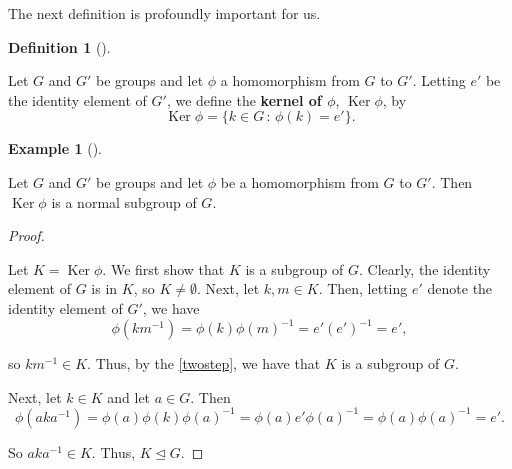 \documentclass[10pt,]{book}
\newcommand{\terminology}[1]{\textbf{#1}}
\theoremstyle{plain}
\theoremstyle{definition}
\newtheorem{definition}[theorem]{Definition}
\theoremstyle{definition}
\theoremstyle{definition}
\newtheorem{example}[theorem]{Example}
\theoremstyle{definition}
\numberwithin{equation}{section}
\DeclareMathOperator{\Ker}{Ker}
\begin{document}
    The next definition is profoundly important for us.
\begin{definition}[{}]\label{definition-66}

        Let \(G\) and \(G'\) be groups and let \(\phi\) a
        homomorphism from \(G\) to \(G'\). Letting \(e'\) be the identity
        element of \(G'\), we define the \terminology{kernel of \(\phi\)}, \(\Ker
        \phi\), by
\begin{equation*}

          \Ker \phi = \{k\in G\,:\,\phi(k)=e'\}.
        
\end{equation*}

\label{notation-73}
\end{definition}
\begin{example}[]\label{example-81}

        Let \(G\) and \(G'\) be groups and let \(\phi\) be a
        homomorphism from \(G\) to \(G'\). Then \(\Ker \phi\) is a normal subgroup
        of \(G\).
\begin{proof}\hypertarget{proof-45}{}

        Let \(K=\Ker \phi\). We first show that \(K\) is a subgroup of
        \(G\). Clearly, the identity element of \(G\) is in \(K\), so \(K\neq
        \emptyset\). Next, let \(k,m\in K\). Then, letting \(e'\) denote the
        identity element of \(G'\), we have
\begin{equation*}

          \phi(km^{-1})=\phi(k)\phi(m)^{-1}=e'(e')^{-1}=e',
        
\end{equation*}

        so \(km^{-1}\in
        K\). Thus, by the \hyperref[twostep]{\ref{twostep}}, we have that \(K\) is a
        subgroup of \(G\).
\par

        Next, let \(k\in K\) and let \(a\in G\). Then
\begin{equation*}

          \phi(aka^{-1})=\phi(a)\phi(k)\phi(a)^{-1}=\phi(a)e'\phi(a)^{-1}=\phi(a)\phi(a)^{-1}=e'.
        
\end{equation*}

\par

        So \(aka^{-1}\in K\). Thus, \(K \unlhd G\).
\end{proof}
\end{example}
\par
\end{document}

